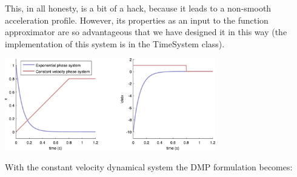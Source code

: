This, in all honesty, is a bit of a hack, because it leads to a non-\/smooth acceleration profile. However, its properties as an input to the function approximator are so advantageous that we have designed it in this way (the implementation of this system is in the Time\+System class).


\begin{DoxyImage}
\includegraphics[height=4cm]{phase_systems-svg}
\caption{Exponential and constant velocity dynamical systems as the 1\+D phase for a dynamical movement primitive.}
\end{DoxyImage}


With the constant velocity dynamical system the D\+M\+P formulation becomes\+:

